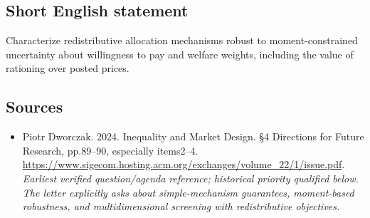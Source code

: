 \documentclass[11pt]{article}
\begin{document}
\subsection{Short English statement}
Characterize redistributive allocation mechanisms robust to moment-constrained uncertainty about willingness to pay and welfare weights, including the value of rationing over posted prices.

\subsection{Sources}
\begin{itemize}\raggedright
\item[\textnormal{[S1]}]\hypertarget{source:30007578:1}{} Piotr Dworczak. 2024. Inequality and Market Design. §4 Directions for Future Research, pp.89–90, especially items2–4.
\url{https://www.sigecom.hosting.acm.org/exchanges/volume_22/1/issue.pdf}.
{\small\textit{Earliest verified question/agenda reference; historical priority qualified below. The letter explicitly asks about simple-mechanism guarantees, moment-based robustness, and multidimensional screening with redistributive objectives.}}
\end{itemize}
\end{document}
